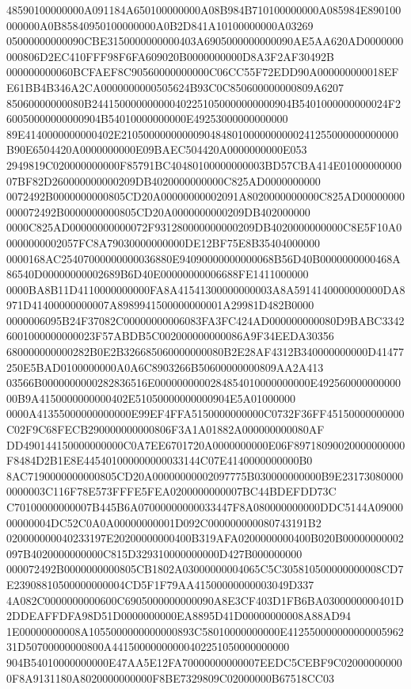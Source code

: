 \documentclass[UTF8,fontset=fandol,zihao=-4,a4paper]{ctexart}
\begin{document}
{{48590100000000A091184A650100000000A08B984B710100000000A085984E890100000000A0B85840950100000000A0B2D841A10100000000A03269
05000000000090CBE3150000000000403A6905000000000090AE5AA620AD0000000000806D2EC410FFF98F6FA609020B0000000000D8A3F2AF30492B
000000000060BCFAEF8C90560000000000C06CC55F72EDD90A000000000018EFE61BB4B346A2CA0000000000505624B93C0C850600000000809A6207
85060000000080B244150000000000402251050000000000904B5401000000000024F260050000000000904B54010000000000E49253000000000000
89E4140000000000402E21050000000000904848010000000000241255000000000000B90E6504420A0000000000E09BAEC504420A0000000000E053
2949819C020000000000F85791BC40480100000000003BD57CBA414E0100000000007BF82D260000000000209DB4020000000000C825AD0000000000
0072492B0000000000805CD20A00000000002091A8020000000000C825AD00000000000072492B0000000000805CD20A0000000000209DB402000000
0000C825AD00000000000072F931280000000000209DB4020000000000C8E5F10A00000000002057FC8A79030000000000DE12BF75E8B35404000000
0000168AC25407000000000036880E94090000000000068B56D40B0000000000468A86540D00000000002689B6D40E00000000006688FE1411000000
0000BA8B11D4110000000000FA8A41541300000000003A8A5914140000000000DA8971D41400000000007A8989941500000000001A29981D482B0000
0000006095B24F37082C00000000006083FA3FC424AD000000000080D9BABC33426001000000000023F57ABDB5C002000000000086A9F34EEDA30356
680000000000282B0E2B326685060000000080B2E28AF4312B340000000000D41477250E5BAD0100000000A0A6C8903266B50600000000809AA2A413
03566B0000000000282836516E0000000000284854010000000000E49256000000000000B9A4150000000000402E51050000000000904E5A01000000
0000A41355000000000000E99EF4FFA5150000000000C0732F36FF45150000000000C02F9C68FECB290000000000806F3A1A01882A000000000080AF
DD490144150000000000C0A7EE6701720A0000000000E06F89718090020000000000F8484D2B1E8E445401000000000033144C07E4140000000000B0
8AC7190000000000805CD20A00000000002097775B030000000000B9E231730800000000003C116F78E573FFFE5FEA0200000000007BC44BDEFDD73C
C70100000000007B445B6A07000000000033447F8A080000000000DDC5144A0900000000004DC52C0A0A00000000001D092C000000000080743191B2
020000000040233197E20200000000400B319AFA0200000000400B020B00000000002097B4020000000000C815D329310000000000D427B000000000
000072492B0000000000805CB1802A03000000004065C5C305810500000000008CD7E23908810500000000004CD5F1F79AA41500000000003049D337
4A082C0000000000600C6905000000000090A8E3CF403D1FB6BA0300000000401D2DDEAFFDFA98D51D0000000000EA8895D41D00000000008A88AD94
1E00000000008A1055000000000000893C58010000000000E41255000000000000596231D50700000000800A44150000000000402251050000000000
904B54010000000000E47AA5E12FA70000000000007EEDC5CEBF9C020000000000F8A9131180A8020000000000F8BE7329809C02000000B67518CC03
}}
\end{document}
